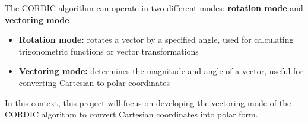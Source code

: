 The CORDIC algorithm can operate in two different modes: \textbf{rotation mode} and \textbf{vectoring mode}
\begin{itemize}
    \item \textbf{Rotation mode:} rotates a vector by a specified angle, used for calculating trigonometric functions or vector transformations
    \item \textbf{Vectoring mode:} determines the magnitude and angle of a vector, useful for converting Cartesian to polar coordinates
\end{itemize}
In this context, this project will focus on developing the vectoring mode of the CORDIC algorithm to convert Cartesian coordinates into polar form.